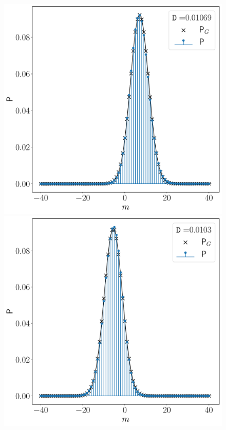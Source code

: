 \begin{figure}
    \centering
    \begin{minipage}[c]{.45\linewidth}
\includegraphics[width=\linewidth]{pics/homodyne/eta1=1, eta2=0.5, theta=1.0.pdf}
        \end{minipage}
\hfill
        \begin{minipage}[c]{.45\linewidth}
 \includegraphics[width=\linewidth]{pics/homodyne/eta1=0.5, eta2=1, theta=1.0.pdf}

\end{minipage}
\end{figure}
